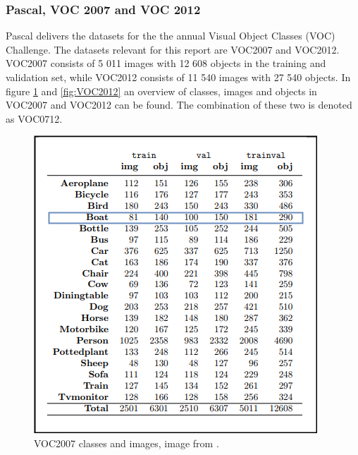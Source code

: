 \subsubsection{Pascal, VOC 2007 and VOC 2012}
Pascal delivers the datasets for the the annual Visual Object Classes (VOC) Challenge. The datasets relevant for this report are VOC2007 and VOC2012. VOC2007 consists of 5 011 images with 12 608 objects in the training and validation set, while VOC2012 consists of  11 540 images with 27 540 objects. In figure \ref{fig:VOC2007} and \ref{fig:VOC2012} an overview of classes, images and objects in VOC2007 and VOC2012 can be found. The combination of these two is denoted as VOC0712.


\begin{figure}[h!]
    \centering
    \includegraphics[scale=0.4]{fig/VOC2007.png}
    \caption{VOC2007 classes and images, image from \citep{Everingham2007}.}
    \label{fig:VOC2007}
\end{figure}

